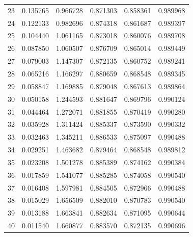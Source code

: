 \begin{table}[ht]
\begin{tabular}{c c c c c c}
23 & 0.135765 & 0.966728 & 0.871303 & 0.858361 & 0.989968 \\
24 & 0.122133 & 0.982696 & 0.874318 & 0.861687 & 0.989397 \\
25 & 0.104440 & 1.061165 & 0.873018 & 0.860076 & 0.989708 \\
26 & 0.087850 & 1.060507 & 0.876709 & 0.865014 & 0.989449 \\
27 & 0.079003 & 1.147307 & 0.872135 & 0.860752 & 0.989241 \\
28 & 0.065216 & 1.166297 & 0.880659 & 0.868548 & 0.989345 \\
29 & 0.058847 & 1.169885 & 0.879048 & 0.867613 & 0.989864 \\
30 & 0.050158 & 1.244593 & 0.881647 & 0.869796 & 0.990124 \\
31 & 0.044464 & 1.272071 & 0.881855 & 0.870419 & 0.990280 \\
32 & 0.035928 & 1.311424 & 0.885337 & 0.873590 & 0.990332 \\
33 & 0.032463 & 1.345211 & 0.886533 & 0.875097 & 0.990488 \\
34 & 0.029251 & 1.463682 & 0.879464 & 0.868548 & 0.989812 \\
35 & 0.023208 & 1.501278 & 0.885389 & 0.874162 & 0.990384 \\
36 & 0.017859 & 1.541077 & 0.885285 & 0.874058 & 0.990540 \\
37 & 0.016408 & 1.597981 & 0.884505 & 0.872966 & 0.990488 \\
38 & 0.015029 & 1.656509 & 0.882010 & 0.870783 & 0.990540 \\
39 & 0.013188 & 1.663841 & 0.882634 & 0.871095 & 0.990644 \\
40 & 0.011540 & 1.660877 & 0.883570 & 0.872135 & 0.990696 \\
\hline
\end{tabular}
\end{table}

